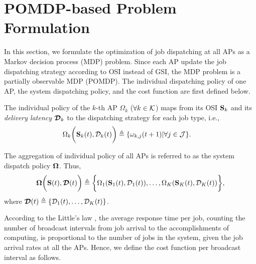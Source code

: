 \section{POMDP-based Problem Formulation}
\label{sec:formulation}
In this section, we formulate the optimization of job dispatching at all APs as a Markov decision process (MDP) problem.
Since each AP update the job dispatching strategy according to OSI instead of GSI, the MDP problem is a partially observable MDP (POMDP).
The individual dispatching policy of one AP, the system dispatching policy, and the cost function are first defined below.

\begin{definition}
    The individual policy of the $k$-th AP $\Omega_{k}$ ($\forall k \in\mathcal{K}$) maps from its OSI $\mathbf{S}_{k}$ and its \emph{delivery latency} $\boldsymbol{\mathcal{D}}_{k}$ to the dispatching strategy for each job type, i.e.,
    \begin{align}
        &\Omega_{k} \bigg( \mathbf{S}_{k}(t), \mathcal{D}_{k}(t) \bigg)
        \triangleq \{\omega_{k,j}(t+1)|\forall j\in\mathcal{J}\}.
        \label{def:action}
    \end{align}

    The aggregation of individual policy of all APs is referred to as the system dispatch policy $\boldsymbol{\Omega}$.
    Thus,
    {\small
    \begin{align}
        \boldsymbol{\Omega}\bigg( \mathbf{S}(t), \boldsymbol{\mathcal{D}}(t) \bigg) \triangleq \bigg\{
            \Omega_{1}(\mathbf{S}_{1}(t), \mathcal{D}_{1}(t)), \dots, \Omega_{K}(\mathbf{S}_{K}(t),\mathcal{D}_{K}(t))
        \bigg\},
    \end{align}
    }
    where $\boldsymbol{\mathcal{D}}(t) \triangleq \{ \mathcal{D}_{1}(t), \dots, \mathcal{D}_{K}(t) \}$.
\end{definition}

According to the Little's law \cite{Little1961}, the average response time per job, counting the number of broadcast intervals from job arrival to the accomplishments of computing, is proportional to the number of jobs in the system, given the job arrival rates at all the APs.
Hence, we define the cost function per broadcast interval as follows.

